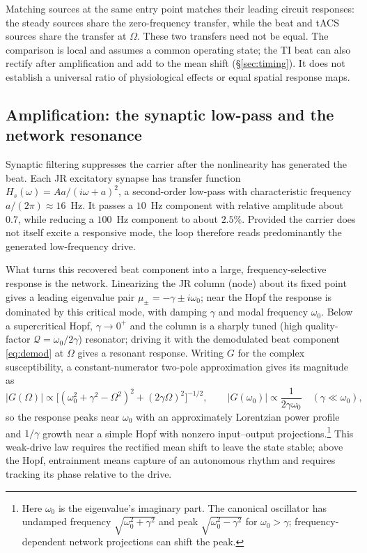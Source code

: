 \documentclass[11pt,a4paper]{article}
\begin{document}
Matching sources at the same entry point matches their leading circuit responses:
the steady sources share the zero-frequency transfer, while the beat and tACS
sources share the transfer at $\Omega$. These two transfers need not be equal.
The comparison is local and assumes a common operating state; the TI beat can
also rectify after amplification and add to the mean shift
(\S\ref{sec:timing}). It does not establish a universal ratio of physiological
effects or equal spatial response maps.

\subsection{Amplification: the synaptic low-pass and the network resonance}\label{sec:carrier}
Synaptic filtering suppresses the carrier after the nonlinearity has generated
the beat. Each JR excitatory synapse has transfer function
$H_s(\omega)=Aa/(i\omega+a)^2$, a second-order low-pass with characteristic
frequency $a/(2\pi)\approx16$~Hz. It passes a $10$~Hz component with relative
amplitude about $0.7$, while reducing a $100$~Hz component to about $2.5\%$. Provided the carrier does not itself excite a responsive
mode, the loop therefore reads predominantly the generated low-frequency drive.


What turns this recovered beat component into a large, frequency-selective response is
the network. Linearizing the JR column (node) about its fixed point gives a leading eigenvalue pair
$\mu_\pm=-\gamma\pm i\omega_0$; near the Hopf the response is dominated by this critical
mode, with damping $\gamma$ and modal frequency $\omega_0$.
Below a supercritical Hopf, $\gamma\to0^+$ and
the column is a sharply tuned (high quality-factor $\mathcal{Q}=\omega_0/2\gamma$) resonator;
driving it with the demodulated beat component
\eqref{eq:demod} at $\Omega$ gives a resonant response. Writing $G$ for the complex susceptibility, a constant-numerator
two-pole approximation gives its magnitude as
\begin{equation}
|G(\Omega)|\propto\big[(\omega_0^2+\gamma^2-\Omega^2)^2+(2\gamma\Omega)^2\big]^{-1/2},
\qquad |G(\omega_0)|\propto\frac{1}{2\gamma\omega_0}
\quad(\gamma\ll\omega_0),
\label{eq:gain}
\end{equation}
so the response peaks near $\omega_0$ with an approximately Lorentzian power
profile and $1/\gamma$ growth near a simple Hopf with nonzero input--output
projections.\footnote{Here $\omega_0$ is the eigenvalue's imaginary part. The
canonical oscillator has undamped frequency $\sqrt{\omega_0^2+\gamma^2}$ and
peak $\sqrt{\omega_0^2-\gamma^2}$ for $\omega_0>\gamma$; frequency-dependent
network projections can shift the peak.}
This weak-drive law requires the rectified mean shift to leave the state stable;
above the Hopf, entrainment means capture of an autonomous rhythm and
requires tracking its phase relative to the drive.
\end{document}
